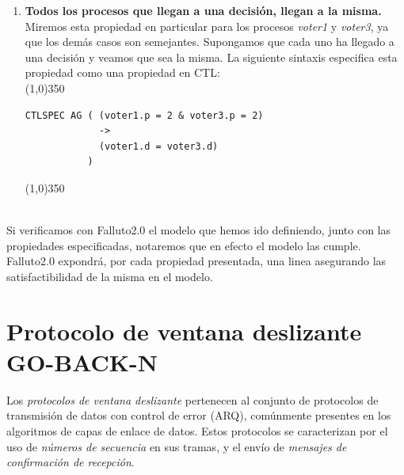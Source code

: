 \documentclass[titlepage, 12pt]{book}
\begin{document}
\begin{enumerate}
\item \textbf{Todos los procesos que llegan a una decisi\'on, llegan a la misma.}\\ Miremos esta propiedad en particular para los procesos \textit{voter1} y \textit{voter3}, ya que los dem\'as casos son semejantes. Supongamos que cada uno ha llegado a una decisi\'on y veamos que sea la misma. La siguiente sintaxis especifica esta propiedad como una propiedad en CTL:\\
\noindent \line(1,0){350}
\begin{verbatim}
CTLSPEC AG ( (voter1.p = 2 & voter3.p = 2) 
             -> 
             (voter1.d = voter3.d)
           )
\end{verbatim}
\noindent \line(1,0){350}
~\\\\

\end{enumerate}

Si verificamos con Falluto2.0 el modelo que hemos ido definiendo, junto con las propiedades especificadas, notaremos que en efecto el modelo las cumple. Falluto2.0 expondr\'a, por cada propiedad presentada, una linea asegurando las satisfactibilidad de la misma en el modelo.



\section{Protocolo de ventana deslizante\\GO-BACK-N}

Los \textit{protocolos de ventana deslizante} pertenecen al conjunto de protocolos de transmisi\'on de datos con control de error (ARQ), comúnmente presentes en los algoritmos de capas de enlace de datos. Estos protocolos se caracterizan por el uso de \textit{números de secuencia} en sus tramas, y el env\'io de \textit{mensajes de confirmaci\'on de recepci\'on}.\\
\end{document}
